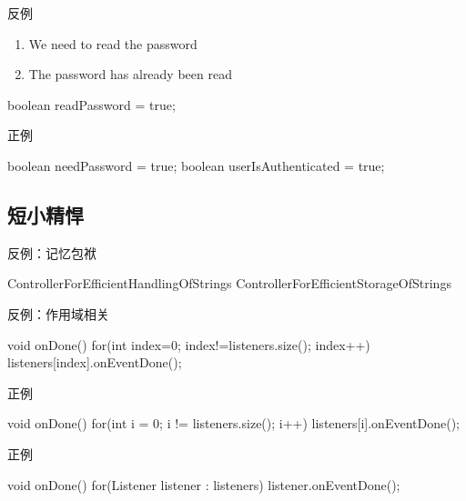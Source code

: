 \begin{frame}[fragile]{反例}
\begin{enumerate}
  \item We need to read the password
  \item The password has already been read
\end{enumerate}

  \begin{java}
boolean readPassword = true;
  \end{java}
\end{frame}

\begin{frame}[fragile]{正例}
  \begin{java}
boolean needPassword = true;
boolean userIsAuthenticated = true;
  \end{java}
\end{frame}

\subsection{短小精悍}

\begin{frame}[fragile]{反例：记忆包袱}
  \begin{java}
ControllerForEfficientHandlingOfStrings
ControllerForEfficientStorageOfStrings
  \end{java}
\end{frame}

\begin{frame}[fragile]{反例：作用域相关}
  \begin{java}
void onDone() {
  for(int index=0; index!=listeners.size(); index++) {
    listeners[index].onEventDone();
  }
}
  \end{java}
\end{frame}

\begin{frame}[fragile]{正例}
  \begin{java}
void onDone() {
  for(int i = 0; i != listeners.size(); i++) {
    listeners[i].onEventDone();
  }
}
  \end{java}
\end{frame}

\begin{frame}[fragile]{正例}
  \begin{java}
void onDone() {
  for(Listener listener : listeners) {
    listener.onEventDone();
  }
}
  \end{java}
\end{frame}

